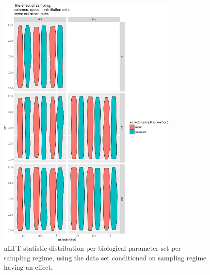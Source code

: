 \documentclass{article}
\begin{document}
\begin{figure}[!htbp]
  \includegraphics[width=0.8\textwidth]{fig_sampling.png}
  \caption{
    nLTT statistic distribution per biological parameter set per sampling
    regime, using the data set conditioned on sampling regime having an effect.
  }
\end{figure}

\end{document}
